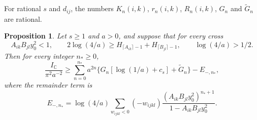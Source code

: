 \documentclass[11pt]{amsart}
\numberwithin{equation}{section}
\newtheorem{proposition}[equation]{Proposition}
\theoremstyle{definition}
\theoremstyle{remark}
\newcommand{\C}{\mathbb C}
\begin{document}
For rational $s$ and $d_{ij}$, the numbers $K_n(i,k)$, $r_n(i,k)$,
$R_n(i,k)$, $G_n$ and $\widetilde G_n$ are rational.

\begin{proposition}\label{pf:overlap}
Let $s\ge1$ and $a>0$, and suppose that for every cross
\begin{equation}\label{pf:cross-threshold}
 A_{ik}B_{jl}y_0^2<1,\qquad
 2\log(4/a)\ge H_{\lceil A_{ik}\rceil-1}+H_{\lceil B_{jl}\rceil-1},
 \qquad \log(4/a)>1/2 .
\end{equation}
Then for every integer $n_*\ge0$,
\begin{equation}\label{pf:collected-overlap}
 \frac{I_\C}{\pi^2a^{-2}}\ge
 \sum_{n=0}^{n_*}a^{2n}\bigl\{G_n[\log(1/a)+c_s]+\widetilde G_n\bigr\}
 -E_{-,n_*},
\end{equation}
where the \emph{remainder term} is
\[
 E_{-,n_*}=\log(4/a)\sum_{w_{ijkl}<0}(-w_{ijkl})
 \frac{(A_{ik}B_{jl}y_0^2)^{n_*+1}}{1-A_{ik}B_{jl}y_0^2}.
\]
\end{proposition}
\end{document}
